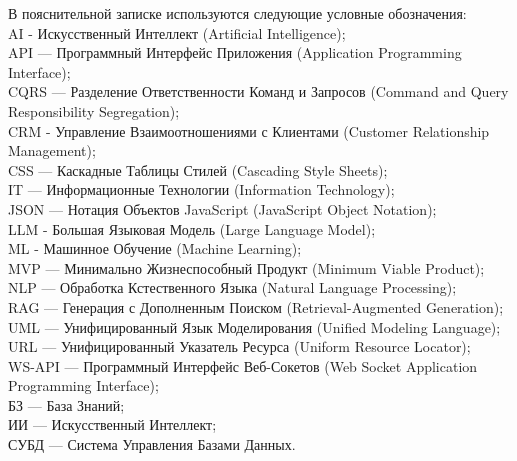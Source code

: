 \label{sec:reduction}

В пояснительной записке используются следующие условные обозначения:\\
AI - Искусственный Интеллект (Artificial Intelligence);\\
API — Программный Интерфейс Приложения (Application Programming Interface);\\
CQRS — Разделение Ответственности Команд и Запросов (Command and Query Responsibility Segregation);\\
CRM - Управление Взаимоотношениями с Клиентами (Customer Relationship Management);\\
CSS — Каскадные Таблицы Стилей (Cascading Style Sheets);\\
IT — Информационные Технологии (Information Technology);\\
JSON — Нотация Объектов JavaScript (JavaScript Object Notation);\\
LLM - Большая Языковая Модель (Large Language Model);\\
ML - Машинное Обучение (Machine Learning);\\
MVP — Минимально Жизнеспособный Продукт (Minimum Viable Product);\\
NLP — Обработка Кстественного Языка (Natural Language Processing);\\
RAG — Генерация с Дополненным Поиском (Retrieval-Augmented Generation);\\
UML — Унифицированный Язык Моделирования (Unified Modeling Language);\\
URL — Унифицированный Указатель Ресурса (Uniform Resource Locator);\\
WS-API — Программный Интерфейс Веб-Сокетов (Web Socket Application Programming Interface);\\
БЗ — База Знаний;\\
ИИ — Искусственный Интеллект;\\
СУБД — Система Управления Базами Данных.
